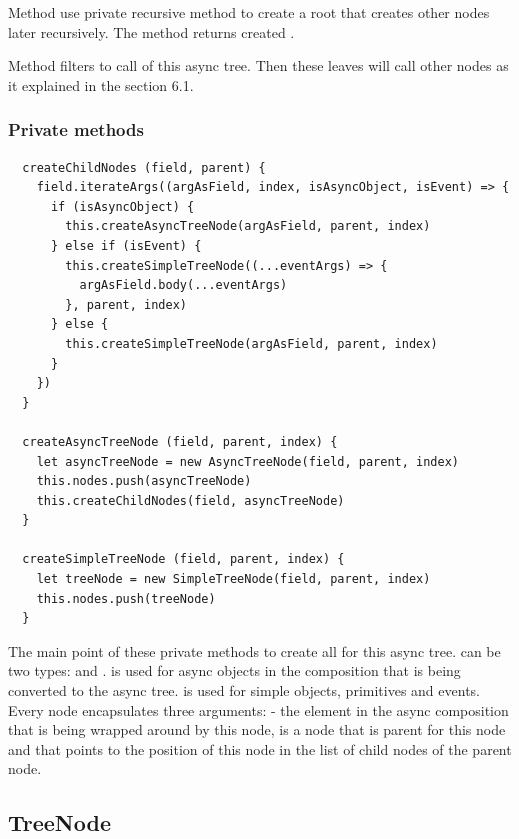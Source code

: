 \documentclass{article}
\begin{document}
Method  use private recursive method  to create a root that creates other nodes later recursively. The method returns created .

Method  filters  to call  of this async tree. Then these leaves will call other nodes as it explained in the section 6.1.

\vspace*{10px}

\subsubsection{Private methods}

\begin{verbatim}
  createChildNodes (field, parent) {
    field.iterateArgs((argAsField, index, isAsyncObject, isEvent) => {
      if (isAsyncObject) {
        this.createAsyncTreeNode(argAsField, parent, index)
      } else if (isEvent) {
        this.createSimpleTreeNode((...eventArgs) => {
          argAsField.body(...eventArgs)
        }, parent, index)
      } else {
        this.createSimpleTreeNode(argAsField, parent, index)
      }
    })
  }

  createAsyncTreeNode (field, parent, index) {
    let asyncTreeNode = new AsyncTreeNode(field, parent, index)
    this.nodes.push(asyncTreeNode)
    this.createChildNodes(field, asyncTreeNode)
  }

  createSimpleTreeNode (field, parent, index) {
    let treeNode = new SimpleTreeNode(field, parent, index)
    this.nodes.push(treeNode)
  }
\end{verbatim}

The main point of these private methods to create all  for this async tree.  can be two types:  and .  is used for async objects in the composition that is being converted to the async tree.  is used for simple objects, primitives and events. Every node encapsulates three arguments:  - the element in the async composition that is being wrapped around by this node,  is a node that is parent for this node and  that points to the position of this node in the list of child nodes of the parent node. 

\vspace*{10px}

\subsection{TreeNode}
\end{document}
